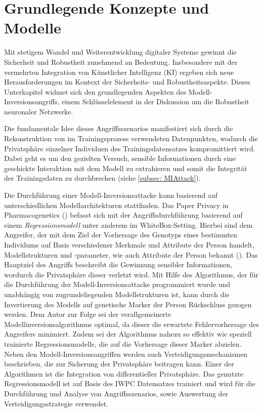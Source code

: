 \section{Grundlegende Konzepte und Modelle}\label{chpt:Stand_der_Technik_MI}
Mit stetigem Wandel und Weiterentwicklung digitaler Systeme gewinnt die Sicherheit und Robustheit zunehmend an Bedeutung. Insbesondere mit der vermehrten Integration von Künstlicher Intelligenz (KI) ergeben sich neue Herausforderungen im Kontext der Sicherheits- und Robustheitsaspekte. Dieses Unterkapitel widmet sich den grundlegenden Aspekten des Modell-Inversionsangriffs, einem Schlüsselelement in der Diskussion um die Robustheit neuronaler Netzwerke.

Die fundamentale Idee dieses Angriffsszenarios manifestiert sich durch die Rekonstruktion von im Trainingsprozess verwendeten Datenpunkten, wodurch die Privatsphäre einzelner Individuen des Trainingsdatensatzes kompromittiert wird. Dabei geht es um den gezielten Versuch, sensible Informationen durch eine geschickte Interaktion mit dem Modell zu extrahieren und somit die Integrität der Trainingsdaten zu durchbrechen (siehe \ref{subsec: MIAttack}). 

Die Durchführung einer Modell-Inversionsattacke kann basierend auf unterschiedlichen Modellarchitekturen stattfinden. Das Paper \glqq Privacy in Pharmacogenetics\grqq{} (\cite{fredrikson_privacy_2014}) befasst sich mit der Angriffsdurchführung basierend auf einem \textit{Regressionsmodell} unter anderem im WhiteBox-Setting. Hierbei sind dem Angreifer, der mit dem Ziel der Vorhersage des Genotyps eines bestimmten Individums auf Basis verschiedener Merkmale und Attribute der Person handelt, Modellstrukturen und -parameter, wie auch Attribute der Person bekannt (\cite[20]{fredrikson_privacy_2014}). Das Hauptziel des Angriffs beschreibt die Gewinnung sensibler Informationen, wordurch die Privatsphäre dieser verletzt wird. Mit Hilfe des Algorithmus, der für die Durchführung der Modell-Inversionsattacke programmiert wurde und unabhängig von zugrundeliegenden Modellstrukturen ist, kann durch die Invertierung des Modells auf genetische Marker der Person Rückschluss gezogen werden. Dem Autor zur Folge sei der verallgemeinerte Modellinversionsalgorithmus optimal, da dieser die erwartete Fehlervorhersage des Angreifers minimiert. Zudem sei der Algorithmus nahezu so effektiv wie speziell trainierte Regressionsmodelle, die auf die Vorhersage dieser Marker abzielen. Neben den Modell-Inversionsangriffen werden auch Verteidigungsmechanismen beschrieben, die zur Sicherung der Privatsphäre beitragen kann. Einer der Algorithmen ist die Integration von differentieller Privatsphäre. Das genutzte Regressionsmodell ist auf Basis des IWPC Datensatzes trainiert und wird für die Durchführung und Analyse von Angriffsszenarios, sowie Auswertung der Verteidigungsstrategie verwendet.

